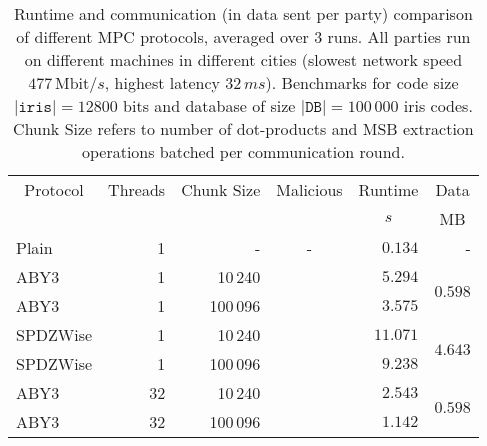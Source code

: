 \documentclass[a4paper,11pt,
]{article}
\newcommand{\cmark}{\ding{51}}%
\newcommand{\xmark}{\ding{55}}%
\begin{document}
\begin{table}[ht]
    \centering
    \caption{Runtime and communication (in data sent per party) comparison of different MPC protocols, averaged over 3 runs. All parties run on different machines in different cities (slowest network speed $477\,\text{Mbit}/s$, highest latency $32\,ms$). Benchmarks for code size $|\texttt{iris}| = 12800$ bits and database of size $|\texttt{DB}| = 100\,000$ iris codes. Chunk Size refers to number of dot-products and MSB extraction operations batched per communication round.}
    \label{tab::bench_network_100k_city}
    \begin{tabular}{lrrcrr}
        \toprule
        \multicolumn{1}{c}{Protocol} & \multicolumn{1}{c}{Threads} & \multicolumn{1}{c}{Chunk Size} & \multicolumn{1}{c}{Malicious} & \multicolumn{1}{c}{Runtime} & \multicolumn{1}{c}{Data} \\
                                     &                             &                                &                               & \multicolumn{1}{c}{$s$}     & \multicolumn{1}{c}{MB}   \\
        \midrule
        Plain                        & 1                           & -                              & -                             & $0.134$                     & -                        \\
        ABY3                         & 1                           & 10\,240                        & \xmark                        & $5.294$                     & \multirow{2}{*}{$0.598$} \\
        ABY3                         & 1                           & 100\,096                       & \xmark                        & $3.575$                     &                          \\
        SPDZWise                     & 1                           & 10\,240                        & \cmark                        & $11.071$                    & \multirow{2}{*}{$4.643$} \\
        SPDZWise                     & 1                           & 100\,096                       & \cmark                        & $9.238$                     &                          \\
        \midrule
        ABY3                         & 32                          & 10\,240                        & \xmark                        & $2.543$                     & \multirow{2}{*}{$0.598$} \\
        ABY3                         & 32                          & 100\,096                       & \xmark                        & $1.142$                     &                          \\

\end{tabular}
\end{table}
\end{document}
